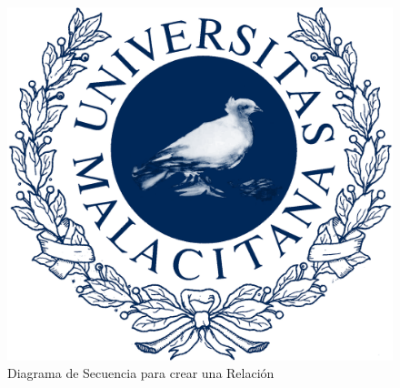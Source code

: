 \newpage %

\begin{figure}[H]
    \includegraphics[width=1\linewidth]{assets/umaLogo.png}
    \caption{Diagrama de Secuencia para crear una Relación}
   \end{figure}
\vspace{1.0cm}

\newpage %